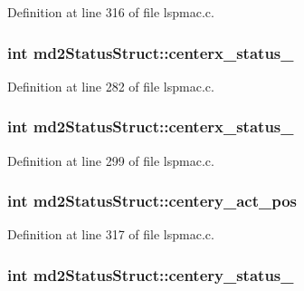 Definition at line 316 of file lspmac.\-c.

\hypertarget{structmd2StatusStruct_aa619cdbd7a563408c6b825ddc4f74ebb}{
\subsubsection[{centerx\-\_\-status\-\_\-1}]{\setlength{\rightskip}{0pt plus 5cm}int md2\-Status\-Struct\-::centerx\-\_\-status\-\_}}\label{structmd2StatusStruct_aa619cdbd7a563408c6b825ddc4f74ebb}


Definition at line 282 of file lspmac.\-c.

\hypertarget{structmd2StatusStruct_ae4fad6debe138ed7815d463e83f8d0f6}{
\subsubsection[{centerx\-\_\-status\-\_\-2}]{\setlength{\rightskip}{0pt plus 5cm}int md2\-Status\-Struct\-::centerx\-\_\-status\-\_}}\label{structmd2StatusStruct_ae4fad6debe138ed7815d463e83f8d0f6}


Definition at line 299 of file lspmac.\-c.

\hypertarget{structmd2StatusStruct_a6be71a92a599d490ca808af8c7e7faa0}{
\subsubsection[{centery\-\_\-act\-\_\-pos}]{\setlength{\rightskip}{0pt plus 5cm}int md2\-Status\-Struct\-::centery\-\_\-act\-\_\-pos}}\label{structmd2StatusStruct_a6be71a92a599d490ca808af8c7e7faa0}


Definition at line 317 of file lspmac.\-c.

\hypertarget{structmd2StatusStruct_a57f65ebe28ef88f1c632d9f35d9167eb}{
\subsubsection[{centery\-\_\-status\-\_\-1}]{\setlength{\rightskip}{0pt plus 5cm}int md2\-Status\-Struct\-::centery\-\_\-status\-\_}}\label{structmd2StatusStruct_a57f65ebe28ef88f1c632d9f35d9167eb}


